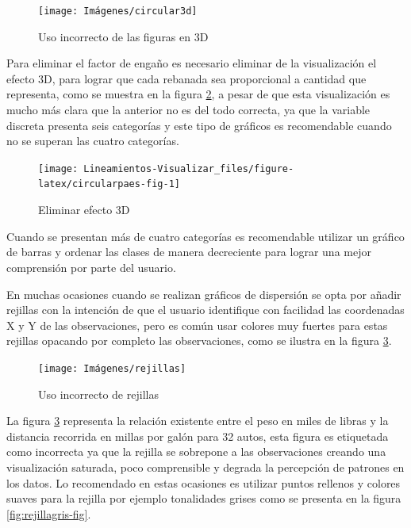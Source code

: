 \documentclass[
]{book}
\begin{document}
\begin{figure}

{\centering \texttt{[image: Imágenes/circular3d]} 

}

\caption{Uso incorrecto de las figuras en 3D}\label{fig:circular3d-fig}
\end{figure}

Para eliminar el factor de engaño es necesario eliminar de la visualización el efecto 3D, para lograr que cada rebanada sea proporcional a cantidad que representa, como se muestra en la figura \ref{fig:circularpaes-fig}, a pesar de que esta visualización es mucho más clara que la anterior no es del todo correcta, ya que la variable discreta presenta seis categorías y este tipo de gráficos es recomendable cuando no se superan las cuatro categorías.

\begin{figure}

{\centering \texttt{[image: Lineamientos-Visualizar\_files/figure-latex/circularpaes-fig-1]} 

}

\caption{Eliminar efecto 3D}\label{fig:circularpaes-fig}
\end{figure}

Cuando se presentan más de cuatro categorías es recomendable utilizar un gráfico de barras y ordenar las clases de manera decreciente para lograr una mejor comprensión por parte del usuario.

En muchas ocasiones cuando se realizan gráficos de dispersión se opta por añadir rejillas con la intención de que el usuario identifique con facilidad las coordenadas X y Y de las observaciones, pero es común usar colores muy fuertes para estas rejillas opacando por completo las observaciones, como se ilustra en la figura \ref{fig:usoderejillas-fig}.

\begin{figure}

{\centering \texttt{[image: Imágenes/rejillas]} 

}

\caption{Uso incorrecto de rejillas}\label{fig:usoderejillas-fig}
\end{figure}

La figura \ref{fig:usoderejillas-fig} representa la relación existente entre el peso en miles de libras y la distancia recorrida en millas por galón para 32 autos, esta figura es etiquetada como incorrecta ya que la rejilla se sobrepone a las observaciones creando una visualización saturada, poco comprensible y degrada la percepción de patrones en los datos. Lo recomendado en estas ocasiones es utilizar puntos rellenos y colores suaves para la rejilla por ejemplo tonalidades grises como se presenta en la figura \ref{fig:rejillagris-fig}.
\end{document}
